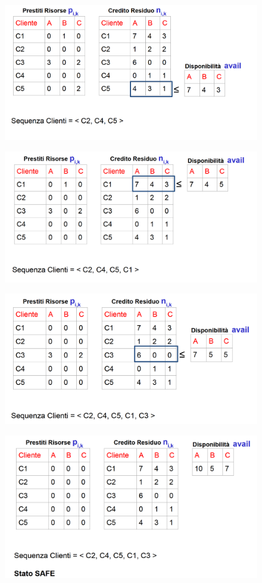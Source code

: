 \begin{figure} [h]
    \centering
    \includegraphics[width=0.65\linewidth]{Images/Screenshot 2025-01-15 125217.png}
\end{figure}

\begin{figure} [h]
    \centering
    \includegraphics[width=0.65\linewidth]{Images/Screenshot 2025-01-15 125252.png}
\end{figure}

\begin{figure} [h]
    \centering
    \includegraphics[width=0.65\linewidth]{Images/Screenshot 2025-01-15 125344.png}
\end{figure}

\begin{figure} [h]
    \centering
    \includegraphics[width=0.65\linewidth]{Images/Screenshot 2025-01-15 125412.png}
\end{figure}
